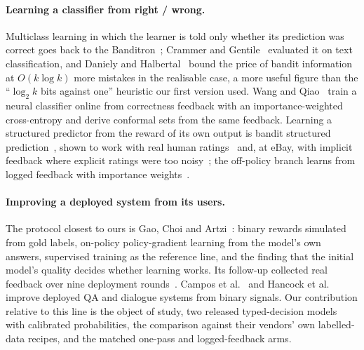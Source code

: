 \documentclass[11pt]{article}
\begin{document}
\paragraph{Learning a classifier from right / wrong.}
Multiclass learning in which the learner is told only whether its prediction was correct goes back to the Banditron~\citep{kakade2008banditron}; Crammer and Gentile~\citep{crammer2011multiclass} evaluated it on text classification, and Daniely and Halbertal~\citep{daniely2013price} bound the price of bandit information at $O(k \log k)$ more mistakes in the realisable case, a more useful figure than the ``$\log_2 k$ bits against one'' heuristic our first version used. Wang and Qiao~\citep{wang2024bccp} train a neural classifier online from correctness feedback with an importance-weighted cross-entropy and derive conformal sets from the same feedback. Learning a structured predictor from the reward of its own output is bandit structured prediction~\citep{sokolov2016bandit,kreutzer2017bandit,nguyen2017bandit}, shown to work with real human ratings~\citep{kreutzer2018reliability} and, at eBay, with implicit feedback where explicit ratings were too noisy~\citep{kreutzer2018ebay}; the off-policy branch learns from logged feedback with importance weights~\citep{swaminathan2015crm,dudik2011doubly,joachims2018banditnet,lawrence2018counterfactual}.

\paragraph{Improving a deployed system from its users.}
The protocol closest to ours is Gao, Choi and Artzi~\citep{gao2022simulating}: binary rewards simulated from gold labels, on-policy policy-gradient learning from the model's own answers, supervised training as the reference line, and the finding that the initial model's quality decides whether learning works. Its follow-up collected real feedback over nine deployment rounds~\citep{gao2023continually}. Campos et al.~\citep{campos2020feedback} and Hancock et al.~\citep{hancock2019feed} improve deployed QA and dialogue systems from binary signals. Our contribution relative to this line is the object of study, two released typed-decision models with calibrated probabilities, the comparison against their vendors' own labelled-data recipes, and the matched one-pass and logged-feedback arms.
\end{document}
